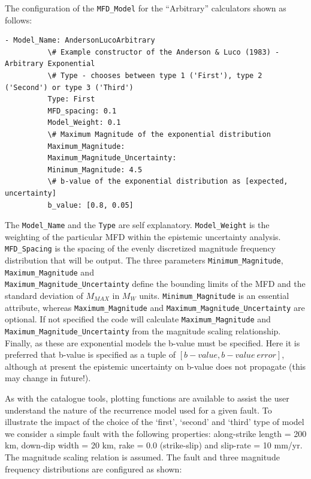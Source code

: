 The configuration of the \verb=MFD_Model= for the \cite{AndersonLuco1983} ``Arbitrary'' calculators shown as follows:

\begin{Verbatim}[frame=single, commandchars=\\\{\}, fontsize=\scriptsize]
        - Model_Name: AndersonLucoArbitrary
          \# Example constructor of the Anderson & Luco (1983) - Arbitrary Exponential
          \# Type - chooses between type 1 ('First'), type 2 ('Second') or type 3 ('Third')
          Type: First
          MFD_spacing: 0.1
          Model_Weight: 0.1
          \# Maximum Magnitude of the exponential distribution
          Maximum_Magnitude:
          Maximum_Magnitude_Uncertainty:
          Minimum_Magnitude: 4.5
          \# b-value of the exponential distribution as [expected, uncertainty]
          b_value: [0.8, 0.05]
\end{Verbatim}

The \verb=Model_Name= and the \verb=Type= are self explanatory. \verb=Model_Weight= is the weighting of the particular MFD within the epistemic uncertainty analysis. \verb=MFD_Spacing= is the spacing of the evenly discretized magnitude frequency distribution that will be output. The three parameters \verb=Minimum_Magnitude=, \verb=Maximum_Magnitude= and \\ \verb=Maximum_Magnitude_Uncertainty= define the bounding limits of the MFD and the standard deviation of $M_{MAX}$ in $M_W$ units. \verb=Minimum_Magnitude= is an essential attribute, whereas \verb=Maximum_Magnitude= and \verb=Maximum_Magnitude_Uncertainty= are optional. If not specified the code will calculate \verb=Maximum_Magnitude= and \\ \verb=Maximum_Magnitude_Uncertainty= from the magnitude scaling relationship. Finally, as these are exponential models the b-value must be specified. Here it is preferred that b-value is specified as a tuple of $\left[ {b-value, b-value\ error} \right]$, although at present the epistemic uncertainty on b-value does not propagate (this may change in future!). 

As with the catalogue tools, plotting functions are available to assist the user understand the nature of the recurrence model used for a given fault. To illustrate the impact of the choice of the `first', `second' and `third' type of model we consider a simple fault with the following properties: along-strike length = 200 km, down-dip width = 20 km, rake = 0.0 (strike-slip) and slip-rate = 10 mm/yr. The \cite{wells1994} magnitude scaling relation is assumed. The fault and three magnitude frequency distributions are configured as shown:


